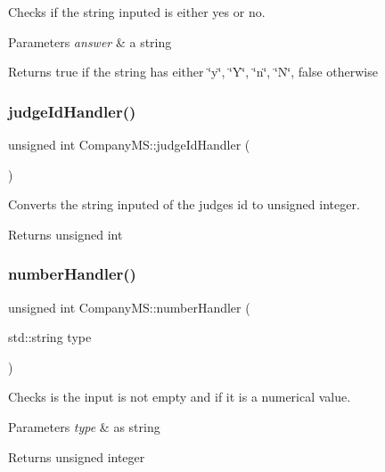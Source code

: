 Checks if the string inputed is either yes or no. 


\begin{DoxyParams}{Parameters}
{\em answer} & a string \\
\hline
\end{DoxyParams}
\begin{DoxyReturn}{Returns}
true if the string has either \char`\"{}y\char`\"{}, \char`\"{}\+Y\char`\"{}, \char`\"{}n\char`\"{}, \char`\"{}\+N\char`\"{}, false otherwise 
\end{DoxyReturn}
\mbox{\label{class_company_m_s_a6955c9821dccc668c367dedc5bc9515c}} 
\subsubsection{\texorpdfstring{judge\+Id\+Handler()}{judgeIdHandler()}}
{\footnotesize\ttfamily unsigned int Company\+M\+S\+::judge\+Id\+Handler (\begin{DoxyParamCaption}{ }\end{DoxyParamCaption})}



Converts the string inputed of the judge\textquotesingle{}s id to unsigned integer. 

\begin{DoxyReturn}{Returns}
unsigned int 
\end{DoxyReturn}
\mbox{\label{class_company_m_s_ada3165bd9c22018019076e810efabfbb}} 
\subsubsection{\texorpdfstring{number\+Handler()}{numberHandler()}}
{\footnotesize\ttfamily unsigned int Company\+M\+S\+::number\+Handler (\begin{DoxyParamCaption}\item[{std\+::string}]{type }\end{DoxyParamCaption})}



Checks is the input is not empty and if it is a numerical value. 


\begin{DoxyParams}{Parameters}
{\em type} & as string \\
\hline
\end{DoxyParams}
\begin{DoxyReturn}{Returns}
unsigned integer 
\end{DoxyReturn}
\mbox{\label{class_company_m_s_a91f5627674f301e51beb79eb6827e4d9}} 
